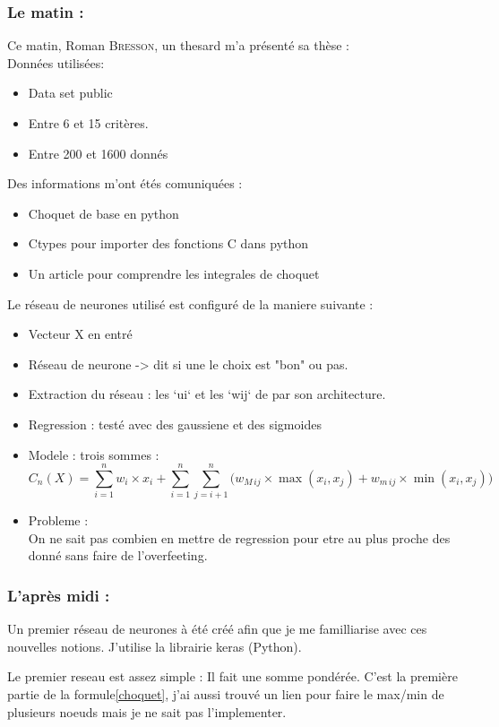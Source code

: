 ﻿\subsubsection*{Le matin :}
Ce matin, Roman \textsc{Bresson}, un thesard m'a présenté sa thèse : \\


Données utilisées:
\begin{itemize}
    \item Data set public
    \item Entre 6 et 15 critères.
    \item Entre 200 et 1600 donnés
\end{itemize}


Des informations m'ont étés comuniquées :
\begin{itemize}
    \item Choquet de base en python
    \item Ctypes pour importer des fonctions C dans python
    \item Un article pour comprendre les integrales de choquet\cite{grabisch2016fuzzy}
\end{itemize}


Le réseau de neurones utilisé est configuré de la maniere suivante :
\begin{itemize}
     \item Vecteur X en entré
     \item Réseau de neurone -> dit si une le choix est "bon" ou pas.
     \item Extraction du réseau : les `ui` et les `wij` de par son architecture.
     \item Regression : testé avec des gaussiene et des sigmoides
     \item Modele : trois sommes :
        \begin{equation}
            \label{choquet}
        C_n (X)  =
        \sum_{i=1}^{n}
                w_i \times x_i +
            \sum_{i=1}^{n}\sum_{j=i+1}^{n}
            \Big(
                w_{M\,ij} \times \max(x_i,x_j) + w_{m\,ij} \times \min(x_i,x_j)
            \Big)
        \end{equation}
    \item Probleme : \\
        On ne sait pas combien en mettre de regression pour etre au plus proche des donné sans faire de l'overfeeting.
\end{itemize}

\subsubsection*{L'après midi :}
Un premier réseau de neurones à été créé afin que je me familliarise avec ces nouvelles notions.
J'utilise la librairie keras\cite{keras} (Python).


Le premier reseau est assez simple : Il fait une somme pondérée.
C'est la première partie de la formule\ref{choquet}, j'ai aussi trouvé un lien pour faire le max/min de plusieurs
noeuds mais je ne sait pas l'implementer.

